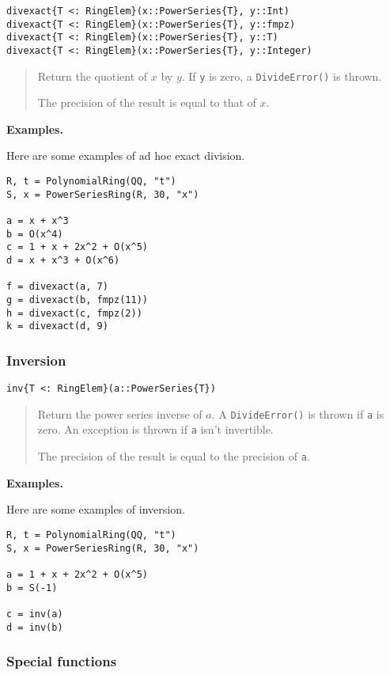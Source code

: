 \documentclass[a4paper,10pt]{article}
\newcommand{\code}{\lstinline}
\newcommand{\desc}[1]{\vspace{-3mm}\begin{quote}#1\end{quote}}
\begin{document}
\begin{lstlisting}
divexact{T <: RingElem}(x::PowerSeries{T}, y::Int)
divexact{T <: RingElem}(x::PowerSeries{T}, y::fmpz)
divexact{T <: RingElem}(x::PowerSeries{T}, y::T)
divexact{T <: RingElem}(x::PowerSeries{T}, y::Integer)
\end{lstlisting}

\desc{Return the quotient of $x$ by $y$. If \code{y} is zero, a
\code{DivideError()} is thrown. 

The precision of the result is equal to that of $x$.}

\textbf{Examples.}

Here are some examples of ad hoc exact division.

\begin{lstlisting}
R, t = PolynomialRing(QQ, "t")
S, x = PowerSeriesRing(R, 30, "x")

a = x + x^3
b = O(x^4)
c = 1 + x + 2x^2 + O(x^5)
d = x + x^3 + O(x^6)

f = divexact(a, 7)
g = divexact(b, fmpz(11))
h = divexact(c, fmpz(2))
k = divexact(d, 9)
\end{lstlisting}

\subsubsection{Inversion}

\begin{lstlisting}
inv{T <: RingElem}(a::PowerSeries{T})
\end{lstlisting}

\desc{Return the power series inverse of $a$. A \code{DivideError()} is thrown 
if \code{a} is zero. An exception is thrown if \code{a} isn't invertible.

The precision of the result is equal to the precision of \code{a}.}

\textbf{Examples.}

Here are some examples of inversion.

\begin{lstlisting}
R, t = PolynomialRing(QQ, "t")
S, x = PowerSeriesRing(R, 30, "x")

a = 1 + x + 2x^2 + O(x^5)
b = S(-1)

c = inv(a)
d = inv(b)
\end{lstlisting}

\subsubsection{Special functions}
\end{document}
